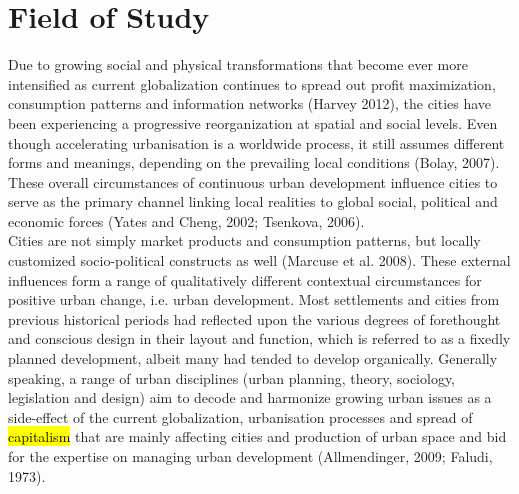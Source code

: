 \documentclass[11pt]{report}
\begin{document}
\section{Field of Study}

Due to growing social and physical transformations that become ever more intensified as current globalization continues to spread out profit maximization, consumption patterns and information networks (Harvey 2012), the cities have been experiencing a progressive reorganization at spatial and social levels. Even though accelerating urbanisation is a worldwide process, it still assumes different forms and meanings, depending on the prevailing local conditions (Bolay, 2007). These overall circumstances of continuous urban development influence cities to serve as the primary channel linking local realities to global social, political and economic forces (Yates and Cheng, 2002; Tsenkova, 2006).
\\
Cities are not simply market products and consumption patterns, but locally customized socio-political constructs as well (Marcuse et al. 2008). These external influences form a range of qualitatively different contextual circumstances for positive urban change, i.e. urban development. Most settlements and cities from previous historical periods had reflected upon the various degrees of forethought and conscious design in their layout and function, which is referred to as a fixedly planned development, albeit many had tended to develop organically. Generally speaking, a range of urban disciplines (urban planning, theory, sociology, legislation and design) aim to decode and harmonize growing urban issues as a side-effect of the current globalization, urbanisation processes and spread of \hl{capitalism} that are mainly affecting cities and production of urban space and bid for the expertise on managing urban development (Allmendinger, 2009; Faludi, 1973). 
\\
\end{document}
